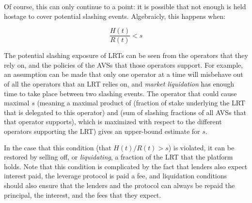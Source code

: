 \documentclass{article}
\begin{document}





Of course, this can only continue to a point: it is possible that not enough is held hostage to cover potential slashing events. Algebraicly, this happens when:

$$
\frac{H(t)}{R(t)} < s
$$

The potential slashing exposure of LRTs can be seen from the operators that they rely on, and the policies of the AVSs that those operators support. For example, an assumption can be made that only one operator at a time will misbehave out of all the operators that an LRT relies on, and \textit{market liquidation} has enough time to take place between two slashing events. The operator that could cause maximal $s$ (meaning a maximal product of (fraction of stake underlying the LRT that is delegated to this operator) and (sum of slashing fractions of all AVSs that that operator supports), which is maximized with respect to the different operators supporting the LRT) gives an upper-bound estimate for $s$. 

In the case that this condition (that $H(t)/R(t) > s$) is violated, it can be restored by selling off, or \textit{liquidating}, a fraction of the LRT that the platform holds. Note that this condition is complicated by the fact that lenders also expect interest paid, the leverage protocol is paid a fee, and liquidation conditions should also ensure that the lenders and the protocol can always be repaid the principal, the interest, and the fees that they expect.
\end{document}
